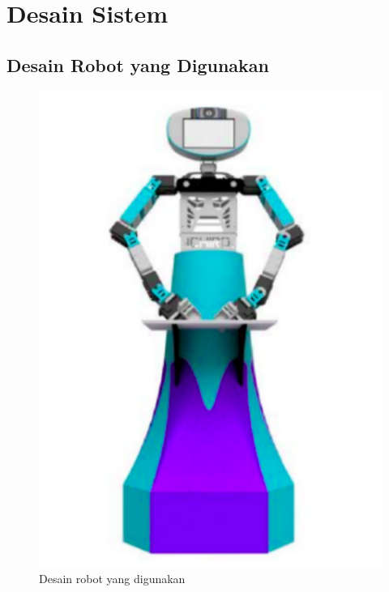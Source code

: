 \section{Desain Sistem}
\label{sec:desainsistem}

\subsection{Desain Robot yang Digunakan}

\begin{figure} [ht]
  \centering
  \includegraphics[scale=0.4]{gambar/desainrobot.png}
  \caption{Desain robot yang digunakan}
  \label{fig:desainrobot}
\end{figure}

